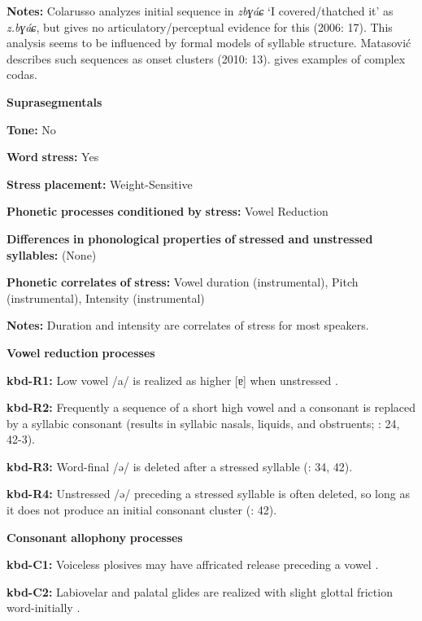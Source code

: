 \textbf{Notes:} Colarusso analyzes initial sequence in \textit{zbɣáɕ} ‘I covered/thatched it’ as \textit{z.bɣáɕ}, but gives no articulatory/perceptual evidence for this (2006: 17). This analysis seems to be influenced by formal models of syllable structure. Matasović describes such sequences as onset clusters (2010: 13). \citet{Applebaum2013} gives examples of complex codas.

\textbf{Suprasegmentals}

\textbf{Tone:} No

\textbf{Word} \textbf{stress:} Yes

\textbf{Stress} \textbf{placement:} Weight-Sensitive

\textbf{Phonetic} \textbf{processes} \textbf{conditioned} \textbf{by} \textbf{stress:} Vowel Reduction

\textbf{Differences} \textbf{in} \textbf{phonological} \textbf{properties} \textbf{of} \textbf{stressed} \textbf{and} \textbf{unstressed} \textbf{syllables:} (None)

\textbf{Phonetic} \textbf{correlates} \textbf{of} \textbf{stress:} Vowel duration (instrumental), Pitch (instrumental), Intensity (instrumental)

\textbf{Notes:} Duration and intensity are correlates of stress for most speakers.

\textbf{Vowel} \textbf{reduction} \textbf{processes}

\textbf{kbd-R1:} Low vowel /a/ is realized as higher [ɐ] when unstressed \citep[98-9]{Applebaum2013}.

\textbf{kbd-R2:} Frequently a sequence of a short high vowel and a consonant is replaced by a syllabic consonant (results in syllabic nasals, liquids, and obstruents; \citealt{Kuipers1960}: 24, 42-3).

\textbf{kbd-R3:} Word-final /ə/ is deleted after a stressed syllable (\citealt{Kuipers1960}: 34, 42).

\textbf{kbd-R4:} Unstressed /ə/ preceding a stressed syllable is often deleted, so long as it does not produce an initial consonant cluster (\citealt{GordonApplebaum2010}: 42).

\textbf{Consonant} \textbf{allophony} \textbf{processes}

\textbf{kbd-C1:} Voiceless plosives may have affricated release preceding a vowel \citep[17]{Kuipers1960}.

\textbf{kbd-C2:} Labiovelar and palatal glides are realized with slight glottal friction word-initially \citep[22]{Kuipers1960}.

